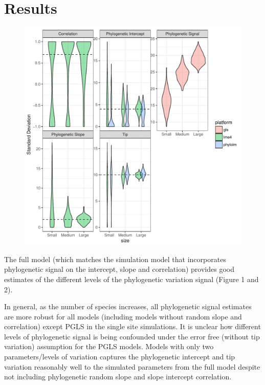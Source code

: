 \section{Results}

\begin{center}
\begin{figure}[h]
\includegraphics[scale=0.8,page=1]{./git_push/ssplot.pdf}
\label{ssplot}
\end{figure}
\end{center}

The full model (which matches the simulation model that incorporates phylogenetic signal on the intercept, slope and correlation) provides good estimates of the different levels of the phylogenetic variation signal (Figure 1 and 2).

In general, as the number of species increases, all phylogenetic signal estimates are more robust for all models (including models without random slope and correlation) except PGLS in the single site simulations. 
It is unclear how different levels of phylogenetic signal is being confounded under the error free (without tip variation) assumption for the PGLS models.
Models with only two parameters/levels of variation captures the phylogenetic intercept and tip variation reasonably well to the simulated parameters from the full model despite not including phylogenetic random slope and slope intercept correlation.

